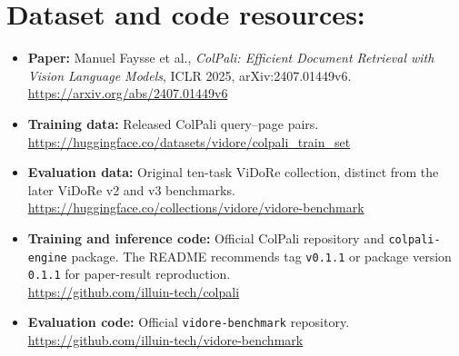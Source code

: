 \documentclass[11pt,a4paper]{article}
\begin{document}
\section{Dataset and code resources:}
\begin{itemize}
    \item \textbf{Paper:} Manuel Faysse et al., \emph{ColPali: Efficient Document Retrieval with Vision Language Models}, ICLR 2025, arXiv:2407.01449v6.\\
    \url{https://arxiv.org/abs/2407.01449v6}
    \item \textbf{Training data:} Released ColPali query--page pairs.\\
    \url{https://huggingface.co/datasets/vidore/colpali_train_set}
    \item \textbf{Evaluation data:} Original ten-task ViDoRe collection, distinct from the later ViDoRe v2 and v3 benchmarks.\\
    \url{https://huggingface.co/collections/vidore/vidore-benchmark}
    \item \textbf{Training and inference code:} Official ColPali repository and \texttt{colpali-engine} package. The README recommends tag \texttt{v0.1.1} or package version \texttt{0.1.1} for paper-result reproduction.\\
    \url{https://github.com/illuin-tech/colpali}
    \item \textbf{Evaluation code:} Official \texttt{vidore-benchmark} repository.\\
    \url{https://github.com/illuin-tech/vidore-benchmark}
\end{itemize}
\end{document}
